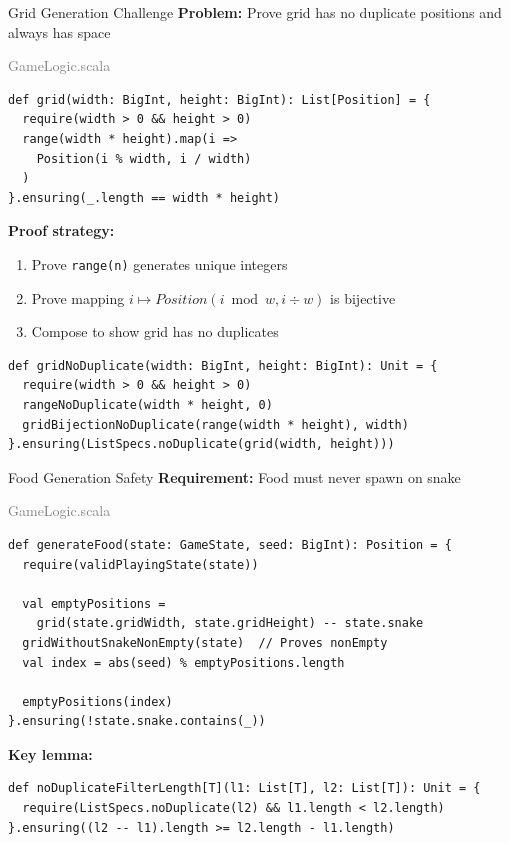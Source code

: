 \documentclass{beamer}
\begin{document}
\begin{frame}[fragile]{Grid Generation Challenge}
\textbf{Problem:} Prove grid has no duplicate positions and always has space

\begin{flushright}
\tiny\textcolor{gray}{GameLogic.scala}
\end{flushright}
\vspace{-0.5cm}
\begin{lstlisting}[style=scala]
def grid(width: BigInt, height: BigInt): List[Position] = {
  require(width > 0 && height > 0)
  range(width * height).map(i => 
    Position(i % width, i / width)
  )
}.ensuring(_.length == width * height)
\end{lstlisting}

\textbf{Proof strategy:}
\begin{enumerate}
  \item Prove \texttt{range(n)} generates unique integers
  \item Prove mapping $i \mapsto Position(i \bmod w, i \div w)$ is bijective
  \item Compose to show grid has no duplicates
\end{enumerate}

\begin{lstlisting}[style=scala]
def gridNoDuplicate(width: BigInt, height: BigInt): Unit = {
  require(width > 0 && height > 0)
  rangeNoDuplicate(width * height, 0)
  gridBijectionNoDuplicate(range(width * height), width)
}.ensuring(ListSpecs.noDuplicate(grid(width, height)))
\end{lstlisting}
\end{frame}
\begin{frame}[fragile]{Food Generation Safety}
\textbf{Requirement:} Food must never spawn on snake

\begin{flushright}
\tiny\textcolor{gray}{GameLogic.scala}
\end{flushright}
\vspace{-0.5cm}
\begin{lstlisting}[style=scala]
def generateFood(state: GameState, seed: BigInt): Position = {
  require(validPlayingState(state))
  
  val emptyPositions = 
    grid(state.gridWidth, state.gridHeight) -- state.snake
  gridWithoutSnakeNonEmpty(state)  // Proves nonEmpty
  val index = abs(seed) % emptyPositions.length
  
  emptyPositions(index)
}.ensuring(!state.snake.contains(_))
\end{lstlisting}

\vspace{0.3cm}
\textbf{Key lemma:}
\begin{lstlisting}[style=scala]
def noDuplicateFilterLength[T](l1: List[T], l2: List[T]): Unit = {
  require(ListSpecs.noDuplicate(l2) && l1.length < l2.length)
}.ensuring((l2 -- l1).length >= l2.length - l1.length)
\end{lstlisting}
\end{frame}
\end{document}
